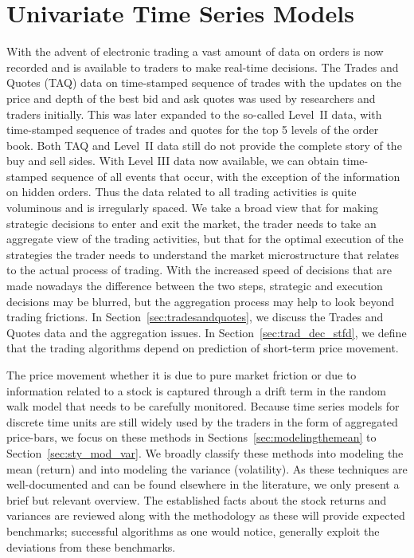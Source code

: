 \chapter{Univariate Time Series Models\label{ch:ch_uvts}}

With the advent of electronic trading a vast amount of data on orders is now recorded and is available to traders to make real-time decisions. The Trades and Quotes (TAQ) data on time-stamped sequence of trades with the updates on the price and depth of the best bid and ask quotes was used by researchers and traders initially. This was later expanded to the so-called Level~II data, with time-stamped sequence of trades and quotes for the top 5 levels of the order book. Both TAQ and Level~II data still do not provide the complete story of the buy and sell sides. With Level III data now available, we can obtain time-stamped sequence of all events that occur, with the exception of the information on hidden orders. Thus the data related to all trading activities is quite voluminous and is irregularly spaced. We take a broad view that for making strategic decisions to enter and exit the market, the trader needs to take an aggregate view of the trading activities, but that for the optimal execution of the strategies the trader needs to understand the market microstructure that relates to the actual process of trading. With the increased speed of decisions that are made nowadays the difference between the two steps, strategic and execution decisions may be blurred, but the aggregation process may help to look beyond trading frictions. In Section~\ref{sec:tradesandquotes}, we discuss the Trades and Quotes data and the aggregation issues. In Section~\ref{sec:trad_dec_stfd}, we define that the trading algorithms depend on prediction of short-term price movement.


The price movement whether it is due to pure market friction or due to information related to a stock is captured through a drift term in the random walk model that needs to be carefully monitored. Because time series models for discrete time units are still widely used by the traders in the form of aggregated price-bars, we focus on these methods in Sections~\ref{sec:modelingthemean} to Section~\ref{sec:sty_mod_var}. We broadly classify these methods into modeling the mean (return) and into modeling the variance (volatility). As these techniques are well-documented and can be found elsewhere in the literature, we only present a brief but relevant overview. The established facts about the stock returns and variances are reviewed along with the methodology as these will provide expected benchmarks; successful algorithms as one would notice, generally exploit the deviations from these benchmarks.



